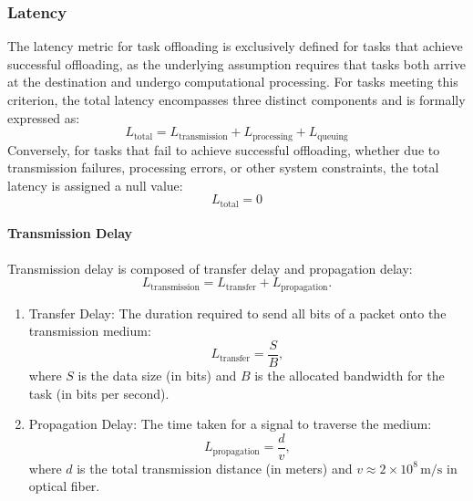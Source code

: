 \documentclass[preprint,12pt]{elsarticle}
\begin{document}
\subsubsection{Latency}
\label{subsubsec:latency_estimation}

The latency metric for task offloading is exclusively defined for tasks that achieve successful offloading, as the underlying assumption requires that tasks both arrive at the destination and undergo computational processing. For tasks meeting this criterion, the total latency encompasses three distinct components and is formally expressed as:
\begin{equation}
L_{\text{total}} = L_{\text{transmission}} + L_{\text{processing}} + L_{\text{queuing}}
\end{equation}
Conversely, for tasks that fail to achieve successful offloading, whether due to transmission failures, processing errors, or other system constraints, the total latency is assigned a null value:
\begin{equation}
L_{\text{total}} = 0
\end{equation}

\paragraph{Transmission Delay}
Transmission delay is composed of transfer delay and propagation delay:
\begin{equation}
L_{\text{transmission}} = L_{\text{transfer}} + L_{\text{propagation}}.
\end{equation}

\begin{enumerate}
    \item Transfer Delay: The duration required to send all bits of a packet onto the transmission medium:
    \begin{equation}
    L_{\text{transfer}} = \frac{S}{B},
    \end{equation}
    where \( S \) is the data size (in bits) and \( B \) is the allocated bandwidth for the task (in bits per second).

    \item Propagation Delay: The time taken for a signal to traverse the medium:
    \begin{equation}
    L_{\text{propagation}} = \frac{d}{v},
    \end{equation}
    where \( d \) is the total transmission distance (in meters) and \( v \approx 2 \times 10^8 \,\text{m/s}\) in optical fiber.
\end{enumerate}
\end{document}
